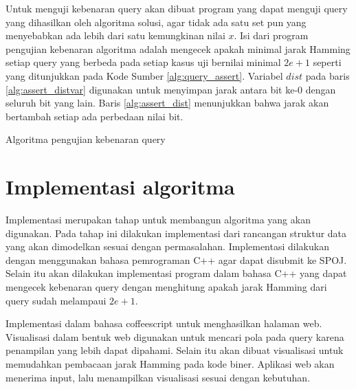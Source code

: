 Untuk menguji kebenaran query akan dibuat program yang dapat menguji query yang dihasilkan oleh algoritma solusi, agar tidak ada satu set pun yang menyebabkan ada lebih dari satu kemungkinan nilai $x$. Isi dari program pengujian kebenaran algoritma adalah mengecek apakah minimal jarak Hamming setiap query yang berbeda pada setiap kasus uji bernilai minimal $2e+1$ seperti yang ditunjukkan pada Kode Sumber \ref{alg:query_assert}. Variabel $dist$ pada baris \ref{alg:assert_distvar} digunakan untuk menyimpan jarak antara bit ke-0 dengan seluruh bit yang lain. Baris \ref{alg:assert_dist} menunjukkan bahwa jarak akan bertambah setiap ada perbedaan nilai bit.

\begin{algorithm}[h]
\caption{Algoritma pengujian kebenaran query}
\label{alg:query_assert}
\end{algorithm}


\section{Implementasi algoritma}

Implementasi merupakan tahap untuk membangun algoritma yang akan digunakan. Pada tahap ini dilakukan implementasi dari rancangan struktur data yang akan dimodelkan sesuai dengan permasalahan. Implementasi dilakukan dengan menggunakan bahasa pemrograman C++ agar dapat disubmit ke SPOJ. Selain itu akan dilakukan implementasi program dalam bahasa C++ yang dapat mengecek kebenaran query dengan menghitung apakah jarak Hamming dari query sudah melampaui $2e+1$.

Implementasi dalam bahasa coffeescript untuk menghasilkan halaman web. Visualisasi dalam bentuk web digunakan untuk mencari pola pada query karena penampilan yang lebih dapat dipahami. Selain itu akan dibuat visualisasi untuk memudahkan pembacaan jarak Hamming pada kode biner. Aplikasi web akan menerima input, lalu menampilkan visualisasi sesuai dengan kebutuhan.